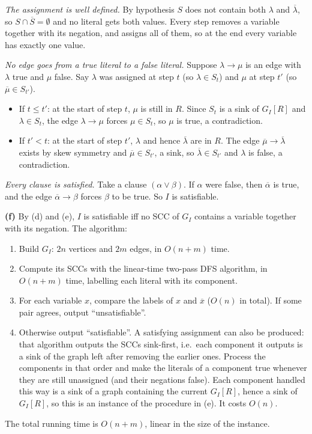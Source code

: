 \documentclass[11pt]{article}
\newcommand{\neglit}[1]{\overline{#1}}
\theoremstyle{definition}
\begin{document}
\emph{The assignment is well defined.} By hypothesis $S$ does not contain both $\lambda$ and $\neglit\lambda$, so
$S\cap\neglit S=\emptyset$ and no literal gets both values. Every step removes a variable together with its
negation, and assigns all of them, so at the end every variable has exactly one value.

\emph{No edge goes from a true literal to a false literal.} Suppose $\lambda\to\mu$ is an edge with $\lambda$ true
and $\mu$ false. Say $\lambda$ was assigned at step $t$ (so $\lambda\in S_t$) and $\mu$ at step $t'$
(so $\neglit\mu\in S_{t'}$).
\begin{itemize}[itemsep=0.2em]
\item If $t\le t'$: at the start of step $t$, $\mu$ is still in $R$. Since $S_t$ is a sink of $G_I[R]$ and
  $\lambda\in S_t$, the edge $\lambda\to\mu$ forces $\mu\in S_t$, so $\mu$ is true, a contradiction.
\item If $t'<t$: at the start of step $t'$, $\lambda$ and hence $\neglit\lambda$ are in $R$. The edge
  $\neglit\mu\to\neglit\lambda$ exists by skew symmetry and $\neglit\mu\in S_{t'}$, a sink, so
  $\neglit\lambda\in S_{t'}$ and $\lambda$ is false, a contradiction.
\end{itemize}

\emph{Every clause is satisfied.} Take a clause $(\alpha\vee\beta)$. If $\alpha$ were false, then $\neglit\alpha$
is true, and the edge $\neglit\alpha\to\beta$ forces $\beta$ to be true. So $I$ is satisfiable.

\textbf{(f)} By (d) and (e), $I$ is satisfiable iff no SCC of $G_I$ contains a variable together with its
negation. The algorithm:
\begin{enumerate}[itemsep=0.2em]
\item Build $G_I$: $2n$ vertices and $2m$ edges, in $O(n+m)$ time.
\item Compute its SCCs with the linear-time two-pass DFS algorithm, in $O(n+m)$ time, labelling each literal with
  its component.
\item For each variable $x$, compare the labels of $x$ and $\neglit x$ ($O(n)$ in total). If some pair agrees,
  output ``unsatisfiable''.
\item Otherwise output ``satisfiable''. A satisfying assignment can also be produced: that algorithm outputs the
  SCCs sink-first, i.e.\ each component it outputs is a sink of the graph left after removing the earlier ones.
  Process the components in that order and make the literals of a component true whenever they are still
  unassigned (and their negations false). Each component handled this way is a sink of a graph containing the
  current $G_I[R]$, hence a sink of $G_I[R]$, so this is an instance of the procedure in (e). It costs $O(n)$.
\end{enumerate}
The total running time is $O(n+m)$, linear in the size of the instance.
\end{document}
